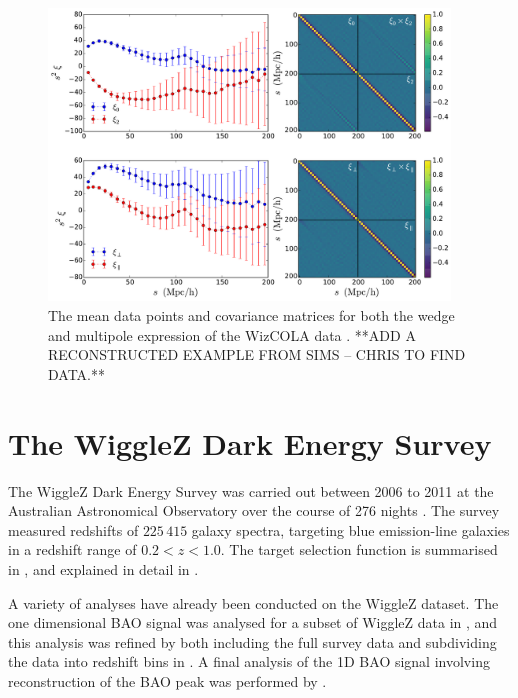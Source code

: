 \documentclass[iop,twocolappendix]{emulateapj}
\newcommand{\red}{\color{red}}
\begin{document}
\begin{figure}[t]
	\begin{center}
		\includegraphics[width=0.95\textwidth]{images/wizcola.pdf}
	\end{center}
	\caption{The mean data points and covariance matrices for both the wedge and multipole expression of the WizCOLA data \citep{KazinKoda2014,KodaBlake2015}.  {\red **ADD A RECONSTRUCTED EXAMPLE FROM SIMS -- CHRIS TO FIND DATA.**}}
	\label{fig:wizcola}
\end{figure}


\section{The WiggleZ Dark Energy Survey}\label{sect:wigglez}

The WiggleZ Dark Energy Survey was carried out between 2006 to 2011 at the Australian Astronomical Observatory over the course of 276 nights \citep{Drinkwater2010}. The survey measured redshifts of $225\,415$ galaxy spectra, targeting blue emission-line galaxies in a redshift range of $0.2 < z < 1.0$. The target selection function is summarised in \citet{BlakeDavis2011}, and explained in detail in \citet{BlakeBrough2010}. 


A variety of analyses have already been conducted on the WiggleZ dataset. 
The one dimensional BAO signal was analysed for a subset of WiggleZ data in \citet{BlakeDavis2011}, and this analysis was refined by both including the full survey data and subdividing the data into redshift bins in \citet{BlakeKazin2011}. A final analysis of the 1D BAO signal involving reconstruction of the BAO peak was performed by \citet{KazinKoda2014}. 
\end{document}
